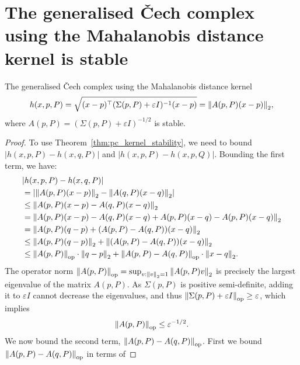 \chapter{The generalised \v{C}ech complex using the Mahalanobis distance kernel is stable}
\label{app:mahalanobis}

\begin{lemma}
    The generalised \v{C}ech complex using the Mahalanobis distance kernel
    \begin{equation}
        h(x, p, P) = \sqrt{(x - p)^\top (\Sigma(p, P) + \varepsilon I)^{-1} (x - p)} = \norm{A(p, P) (x - p)}_2,
    \end{equation}
    where $A(p, P) = (\Sigma(p, P) + \varepsilon I)^{-1/2}$ is stable.
\end{lemma}
\begin{proof}
    To use Theorem~\ref{thm:pc_kernel_stability}, we need to bound
    $|h(x, p, P) - h(x, q, P)|$ and $|h(x, p, P) - h(x, p, Q)|$.
    Bounding the first term, we have:
    \begin{align}
        & |h(x, p, P) - h(x, q, P)| \nonumber \\
        & = |\norm{A(p, P) (x - p)}_2 - \norm{A(q, P) (x - q)}_2| \\
        & \leq \norm{A(p, P) (x - p) - A(q, P) (x - q)}_2 \\
        & = \norm{A(p, P) (x - p) - A(q, P) (x - q) + A(p, P)(x - q) - A(p, P)(x - q)}_2 \\
        & = \norm{A(p, P) (q - p) + (A(p, P) - A(q, P))(x - q)}_2 \\
        & \leq \norm{A(p, P)(q - p)}_2 + \norm{(A(p, P) - A(q, P))(x - q)}_2 \\
        & \leq \norm{A(p, P)}_{\mathrm{op}} \cdot \norm{q - p}_2 + \norm{A(p, P) - A(q, P)}_{\mathrm{op}} \cdot \norm{x - q}_2. \label{eq:bound_h_diff}
    \end{align}
    The operator norm $\norm{A(p, P)}_{\mathrm{op}} = \sup_{v : \norm{v}_2 = 1}
    \norm{A(p, P)v}_2$ is precisely the largest eigenvalue of the matrix $A(p, P)$. 
    As $\Sigma(p, P)$ is positive semi-definite, adding it to $\varepsilon I$ cannot
    decrease the eigenvalues, and thus
    $\norm{\Sigma(p, P) + \varepsilon I}_{\mathrm{op}} \geq \varepsilon$, which implies
    \begin{equation}
        \norm{A(p, P)}_{\mathrm{op}} \leq \varepsilon^{-1/2}.
    \end{equation}
    We now bound the second term, $\norm{A(p, P) - A(q, P)}_{\mathrm{op}}$.
    First we bound $\norm{A(p, P) - A(q, P)}_{\mathrm{op}}$ in terms of

\end{proof}
